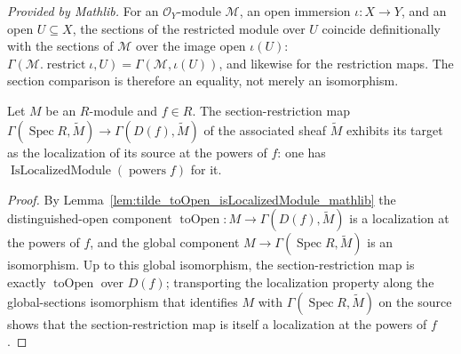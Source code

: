 \begin{lemma}
  \label{lem:restrict_obj_mathlib}
  \mathlibok
  \textit{Provided by Mathlib.}
  For an \(\mathcal{O}_Y\)-module \(\mathcal{M}\), an open immersion \(\iota : X \to Y\), and an open
  \(U \subseteq X\), the sections of the restricted module over \(U\) coincide definitionally with the
  sections of \(\mathcal{M}\) over the image open \(\iota(U)\):
  \(\Gamma(\mathcal{M}.\operatorname{restrict} \iota, U) = \Gamma(\mathcal{M}, \iota(U))\), and
  likewise for the restriction maps. The section comparison is therefore an equality, not merely an
  isomorphism.
\end{lemma}


\begin{lemma}
  \label{lem:tilde_section_isLocalizedModule}
  Let \(M\) be an \(R\)-module and \(f \in R\). The section-restriction map
  \(\Gamma(\operatorname{Spec} R, \widetilde{M}) \to \Gamma(D(f), \widetilde{M})\) of the associated
  sheaf \(\widetilde{M}\) exhibits its target as the localization of its source at the powers of
  \(f\): one has \(\operatorname{IsLocalizedModule}(\operatorname{powers} f)\) for it.
\end{lemma}
\begin{proof}
  \leanok
  By Lemma~\ref{lem:tilde_toOpen_isLocalizedModule_mathlib} the distinguished-open component
  \(\operatorname{toOpen} : M \to \Gamma(D(f), \widetilde{M})\) is a localization at the powers of
  \(f\), and the global component \(M \to \Gamma(\operatorname{Spec} R, \widetilde{M})\) is an
  isomorphism. Up to this global isomorphism, the section-restriction map is exactly
  \(\operatorname{toOpen}\) over \(D(f)\); transporting the localization property along the
  global-sections isomorphism that identifies \(M\) with \(\Gamma(\operatorname{Spec} R,
  \widetilde{M})\) on the source shows that the section-restriction map is itself a localization at the
  powers of \(f\).
\end{proof}

